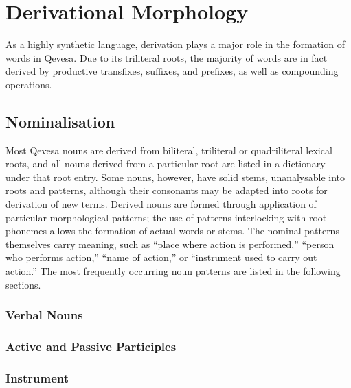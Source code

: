 \documentclass[grammar]{subfiles}
\begin{document}
	\chapter{Derivational Morphology}
	\label{ch:lexical-morphology}

	As a highly synthetic language, derivation plays a major role in the formation of words in Qevesa. Due to its triliteral roots, the majority of words are in fact derived by productive transfixes, suffixes, and prefixes, as well as compounding operations.

	\section{Nominalisation}
	\label{sec:dev_nominalisation}

	Most Qevesa nouns are derived from biliteral, triliteral or quadriliteral lexical roots, and all nouns derived from a particular root are listed in a dictionary under that root entry. Some nouns, however, have solid stems, unanalysable into roots and patterns, although their consonants may be adapted into roots for derivation of new terms. Derived nouns are formed through application of particular morphological patterns; the use of patterns interlocking with root phonemes allows the formation of actual words or stems. The nominal patterns themselves carry meaning, such as “place where action is performed,” “person who performs action,” “name of action,” or “instrument used to carry out action.” The most frequently occurring noun patterns are listed in the following sections.

	\subsection{Verbal Nouns}
	\label{ssec:dev_verbal_nouns}

	\ToBeWritten

	\subsection{Active and Passive Participles}
	\label{ssec:dev_active_passive_participles}

	\ToBeWritten

	\subsection{Instrument}
	\label{ssec:dev_nouns_instrument}

	\ToBeWritten
\end{document}
